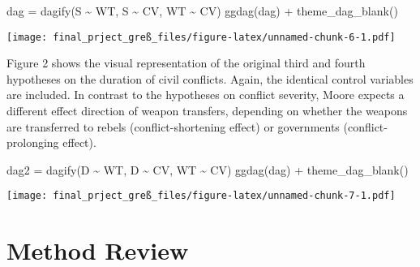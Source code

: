 \documentclass[
]{article}
\newenvironment{Shaded}{\begin{snugshade}}{\end{snugshade}}
\newcommand{\FunctionTok}[1]{\textcolor[rgb]{0.00,0.00,0.00}{#1}}
\newcommand{\NormalTok}[1]{#1}
\newcommand{\OtherTok}[1]{\textcolor[rgb]{0.56,0.35,0.01}{#1}}
\newcommand{\SpecialCharTok}[1]{\textcolor[rgb]{0.00,0.00,0.00}{#1}}
\begin{document}
\begin{Shaded}
\begin{Highlighting}[]
\NormalTok{dag }\OtherTok{=} \FunctionTok{dagify}\NormalTok{(S }\SpecialCharTok{\textasciitilde{}}\NormalTok{ WT,}
\NormalTok{             S }\SpecialCharTok{\textasciitilde{}}\NormalTok{ CV,}
\NormalTok{             WT }\SpecialCharTok{\textasciitilde{}}\NormalTok{ CV)}
\FunctionTok{ggdag}\NormalTok{(dag) }\SpecialCharTok{+}  \FunctionTok{theme\_dag\_blank}\NormalTok{()}
\end{Highlighting}
\end{Shaded}

\texttt{[image: final\_prject\_greß\_files/figure-latex/unnamed-chunk-6-1.pdf]}

Figure 2 shows the visual representation of the original third and
fourth hypotheses on the duration of civil conflicts. Again, the
identical control variables are included. In contrast to the hypotheses
on conflict severity, Moore expects a different effect direction of
weapon transfers, depending on whether the weapons are transferred to
rebels (conflict-shortening effect) or governments (conflict-prolonging
effect).

\begin{Shaded}
\begin{Highlighting}[]
\NormalTok{dag2 }\OtherTok{=} \FunctionTok{dagify}\NormalTok{(D }\SpecialCharTok{\textasciitilde{}}\NormalTok{ WT,}
\NormalTok{             D }\SpecialCharTok{\textasciitilde{}}\NormalTok{ CV,}
\NormalTok{             WT }\SpecialCharTok{\textasciitilde{}}\NormalTok{ CV)}
\FunctionTok{ggdag}\NormalTok{(dag) }\SpecialCharTok{+}  \FunctionTok{theme\_dag\_blank}\NormalTok{()}
\end{Highlighting}
\end{Shaded}

\texttt{[image: final\_prject\_greß\_files/figure-latex/unnamed-chunk-7-1.pdf]}

\hypertarget{method-review}{%
\section{Method Review}\label{method-review}}
\end{document}
